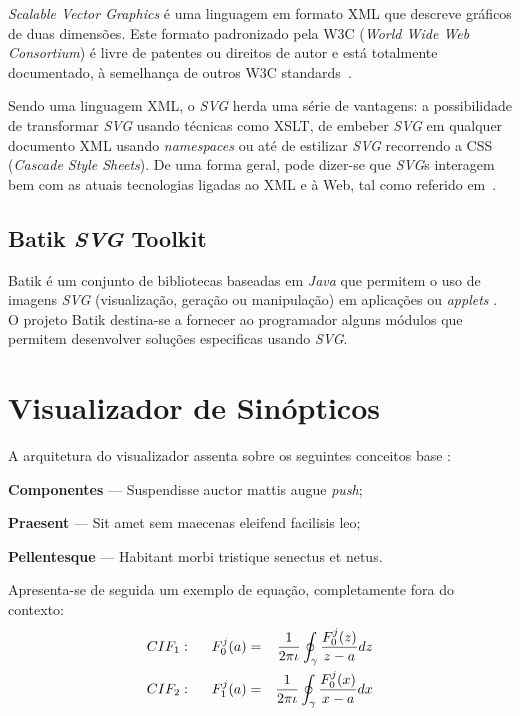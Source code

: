 \documentclass[twocolumn,twoside,11pt,a4paper]{article}
\newcommand{\class}[1]{{\normalfont\slshape #1\/}}
\newcommand{\svg}{\class{SVG}}
\begin{document}
\emph{Scalable Vector Graphics} é uma linguagem em formato XML que
descreve gráficos de duas dimensões. 
Este formato padronizado pela W3C (\emph{World Wide Web Consortium})
é livre de patentes ou direitos de autor e está totalmente
documentado, à semelhança de outros W3C standards~\cite{kn:svgdoc}.

Sendo uma linguagem XML, o \svg{} herda uma série de vantagens: a
possibilidade de transformar \svg{} usando técnicas como XSLT, de embeber
\svg{} em qualquer documento XML usando \textit{namespaces} ou até de 
estilizar \svg{} recorrendo a CSS (\emph{Cascade Style Sheets}). 
De uma forma geral, pode dizer-se que \svg{}s interagem bem com as
atuais tecnologias ligadas ao XML e à Web, tal como referido
em~\cite{kn:svgibm,kn:svgw3c}.

\subsection{Batik \svg{} Toolkit} \label{batik} 

Batik é um conjunto de bibliotecas baseadas em \textit{Java} que
permitem o uso de imagens \svg{} (visualização, geração ou
manipulação) em aplicações ou \textit{applets} \cite{kn:batikarchitecture}.  
O projeto Batik destina-se a fornecer ao programador alguns módulos
que permitem desenvolver soluções especificas usando \svg. 

\lipsum[3]


\section{Visualizador de Sinópticos}\label{sec:application}

A arquitetura do visualizador assenta sobre os seguintes conceitos base \cite{kn:zpmd}:
\begin{compactitem}
\item \textbf{Componentes} --- Suspendisse auctor mattis augue \emph{push};
\item \textbf{Praesent} --- Sit amet sem maecenas eleifend facilisis leo;
\item \textbf{Pellentesque} --- Habitant morbi tristique senectus et netus.
\end{compactitem}

\lipsum[4]

Apresenta-se de seguida um exemplo de equação, completamente fora do contexto:
\begin{eqnarray}
CIF_1: \hspace*{5mm}F_0^j(a) &=& \frac{1}{2\pi \iota} \oint_{\gamma} \frac{F_0^j(z)}{z - a} dz\\
CIF_2: \hspace*{5mm}F_1^j(a) &=& \frac{1}{2\pi \iota} \oint_{\gamma} \frac{F_0^j(x)}{x - a} dx \label{eq:cif}
\end{eqnarray}
\end{document}
